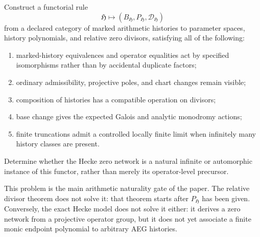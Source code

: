 \begin{problem}
\label{prob:history-to-divisor-functor}
Construct a functorial rule
\[
 \mathfrak H\longmapsto
 (B_{\mathfrak H},P_{\mathfrak H},\mathcal D_{\mathfrak H})
\]
from a declared category of marked arithmetic histories to parameter spaces,
history polynomials, and relative zero divisors, satisfying all of the following:
\begin{enumerate}
\item marked-history equivalences and operator equalities act by specified
isomorphisms rather than by accidental duplicate factors;
\item ordinary admissibility, projective poles, and chart changes remain visible;
\item composition of histories has a compatible operation on divisors;
\item base change gives the expected Galois and analytic monodromy actions;
\item finite truncations admit a controlled locally finite limit when infinitely
many history classes are present.
\end{enumerate}
Determine whether the Hecke zero network is a natural infinite or automorphic
instance of this functor, rather than merely its operator-level precursor.
\end{problem}

This problem is the main arithmetic naturality gate of the paper.  The relative
divisor theorem does not solve it: that theorem starts after $P_{\mathfrak H}$ has
been given.  Conversely, the exact Hecke model does not solve it either: it
derives a zero network from a projective operator group, but it does not yet
associate a finite monic endpoint polynomial to arbitrary AEG histories.
